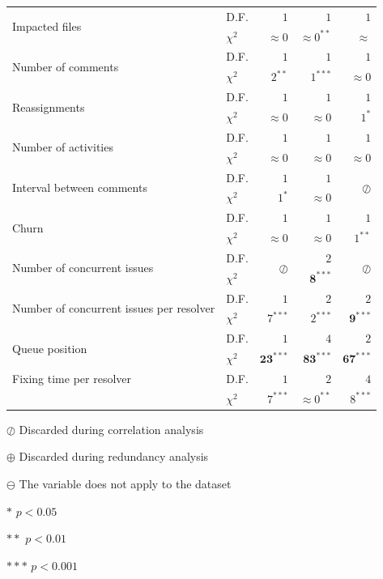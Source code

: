 \begin{table}[t]
\begin{threeparttable}
\begin{tabular}{llrrr}
			\multirow{2}{*}{Impacted files} & 
			D.F. & 
			$1$ &
			$1$ &
			$1$
			\tabularnewline & 
			$\chi^2$ & 
			$\approx 0$ &
			$\approx 0^{\ast\ast}$ &
			$\approx $
			\tabularnewline \hline 
			\multirow{2}{*}{Number of comments} & 
			D.F. & 
			$1$ &
			$1$ &  
			$1$
			\tabularnewline & 
			$\chi^2$ & 
			$2^{\ast\ast}$ &  
			$1^{\ast\ast\ast}$  &
			$\approx 0$
			\tabularnewline \hline 
			\multirow{2}{*}{Reassignments} & 
			D.F. & 
			$1$ & 
			$1$ &
			$1$
			\tabularnewline & 
			$\chi^2$ & 
			$\approx 0$ &  
			$\approx 0$ &
			$1^{\ast}$
			\tabularnewline \hline 
			\multirow{2}{*}{Number of activities} & 
			D.F. & 
			$1$ &
			$1$ &
			$1$
			\tabularnewline & 
			$\chi^2$ & 
			$\approx 0$ &  
			$\approx 0$ &
			$\approx 0$
			\tabularnewline \hline 
			\multirow{2}{*}{Interval between comments} & 
			D.F. & 
			$1$ &
			$1$ &
			\multirow{2}{*}{$\oslash$}
			\tabularnewline & 
			$\chi^2$ & 
			$1^{\ast}$ &  
			$\approx 0$ &
			\tabularnewline \hline 
			\multirow{2}{*}{Churn} & 
			D.F. & 
			$1$ &
			$1$ &
			$1$
			\tabularnewline & 
			$\chi^2$ & 
			$\approx 0$ &  
			$\approx 0$ &
			$1^{\ast\ast}$
			\tabularnewline \hline 
			\multirow{2}{*}{Number of concurrent issues} & 
			D.F. & 
			\multirow{2}{*}{$\oslash$} &
			$2$ &
			\multirow{2}{*}{$\oslash$}
			\tabularnewline &
			$\chi^2$ &
			& %
			$\mathbf{8}^{\ast\ast\ast}$ &
			\tabularnewline \hline 
			\multirow{2}{*}{Number of concurrent issues per resolver} & 
			D.F. & 
			$1$ & 
			$2$ &
			$2$
			\tabularnewline &
			$\chi^2$ &
			$7^{\ast\ast\ast}$ &  
			$2^{\ast\ast\ast}$ &
			$\mathbf{9}^{\ast\ast\ast}$
			\tabularnewline \hline 
			\multirow{2}{*}{Queue position} & 
			D.F. & 
			$1$ &             
			$4$ &
			$2$
			\tabularnewline & 
			$\chi^2$ & 
			$\mathbf{23}^{\ast\ast\ast}$ & 
			$\mathbf{83}^{\ast\ast\ast}$ &
			$\mathbf{67}^{\ast\ast\ast}$
			\tabularnewline \hline 
			\multirow{1}{*}{Fixing time per resolver} & 
			D.F. & 
			$1$ & 
			$2$ &
			$4$
			\tabularnewline &
			$\chi^2$ & 
			$7^{\ast\ast\ast}$ & 
			$\approx 0^{\ast\ast}$ &
			$8^{\ast\ast\ast}$
			\tabularnewline \hline 
		\end{tabular}
		\begin{tablenotes}
		\item[$\oslash$] Discarded during correlation analysis 
		\item[$\oplus$] Discarded during redundancy analysis 
		\item[$\ominus$] The variable does not apply to the dataset
		\item[$\ast$] $p < 0.05$
		\item[$\ast\ast$] $p < 0.01$
		\item[$\ast\ast\ast$] $p < 0.001$ 
		\end{tablenotes}
	\end{threeparttable}
\end{table}

